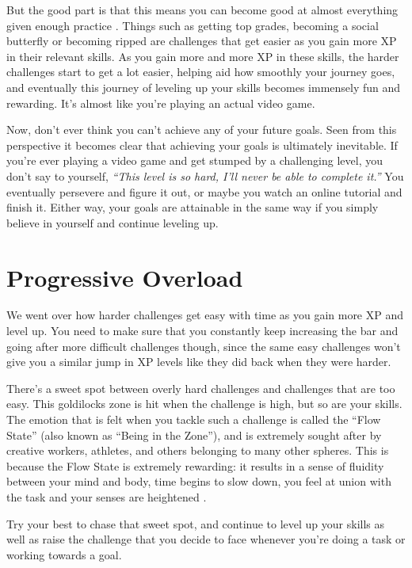 \documentclass[
]{book}
\begin{document}
But the good part is that this means you can become good at almost everything given enough practice \citep{deliberate_practice}. Things such as getting top grades, becoming a social butterfly or becoming ripped are challenges that get easier as you gain more XP in their relevant skills. As you gain more and more XP in these skills, the harder challenges start to get a lot easier, helping aid how smoothly your journey goes, and eventually this journey of leveling up your skills becomes immensely fun and rewarding. It's almost like you're playing an actual video game.

Now, don't ever think you can't achieve any of your future goals. Seen from this perspective it becomes clear that achieving your goals is ultimately inevitable. If you're ever playing a video game and get stumped by a challenging level, you don't say to yourself, \emph{``This level is so hard, I'll never be able to complete it.''} You eventually persevere and figure it out, or maybe you watch an online tutorial and finish it. Either way, your goals are attainable in the same way if you simply believe in yourself and continue leveling up.

\hypertarget{progressive-overload}{%
\section{Progressive Overload}\label{progressive-overload}}

We went over how harder challenges get easy with time as you gain more XP and level up. You need to make sure that you constantly keep increasing the bar and going after more difficult challenges though, since the same easy challenges won't give you a similar jump in XP levels like they did back when they were harder.

There's a sweet spot between overly hard challenges and challenges that are too easy. This goldilocks zone is hit when the challenge is high, but so are your skills. The emotion that is felt when you tackle such a challenge is called the ``Flow State'' (also known as ``Being in the Zone''), and is extremely sought after by creative workers, athletes, and others belonging to many other spheres. This is because the Flow State is extremely rewarding: it results in a sense of fluidity between your mind and body, time begins to slow down, you feel at union with the task and your senses are heightened \citep{flow}.

Try your best to chase that sweet spot, and continue to level up your skills as well as raise the challenge that you decide to face whenever you're doing a task or working towards a goal.
\end{document}
